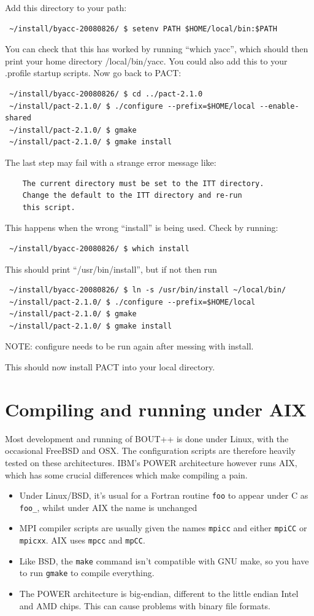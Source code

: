 \documentclass[12pt]{article}
\newcommand{\code}[1]{\texttt{#1}}
\begin{document}
Add this directory to your path:
\begin{verbatim}
 ~/install/byacc-20080826/ $ setenv PATH $HOME/local/bin:$PATH
\end{verbatim}
You can check that this has worked by running ``which yacc'', which should then print
your home directory /local/bin/yacc.
You could also add this to your .profile startup scripts. Now go back to PACT:
\begin{verbatim}
 ~/install/byacc-20080826/ $ cd ../pact-2.1.0
 ~/install/pact-2.1.0/ $ ./configure --prefix=$HOME/local --enable-shared
 ~/install/pact-2.1.0/ $ gmake
 ~/install/pact-2.1.0/ $ gmake install
\end{verbatim}

The last step may fail with a strange error message like:
\begin{verbatim}
    The current directory must be set to the ITT directory.
    Change the default to the ITT directory and re-run
    this script.
\end{verbatim}
This happens when the wrong ``install'' is being used. Check by running:
\begin{verbatim}
 ~/install/byacc-20080826/ $ which install
\end{verbatim}
This should print ``/usr/bin/install'', but if not then run
\begin{verbatim}
 ~/install/byacc-20080826/ $ ln -s /usr/bin/install ~/local/bin/
 ~/install/pact-2.1.0/ $ ./configure --prefix=$HOME/local
 ~/install/pact-2.1.0/ $ gmake
 ~/install/pact-2.1.0/ $ gmake install
\end{verbatim}
NOTE: configure needs to be run again after messing with install.

This should now install PACT into your local directory.

\section{Compiling and running under AIX}

Most development and running of BOUT++ is done under Linux, with the occasional FreeBSD and OSX.
The configuration scripts are therefore heavily tested on these architectures. IBM's POWER
architecture however runs AIX, which has some crucial differences which make compiling a pain.

\begin{itemize}
\item Under Linux/BSD, it's usual for a Fortran routine \code{foo} to appear
  under C as \code{foo\_}, whilst under AIX the name is unchanged
\item MPI compiler scripts are usually given the names \code{mpicc} and
  either \code{mpiCC} or \code{mpicxx}. AIX uses \code{mpcc} and \code{mpCC}.
\item Like BSD, the \code{make} command isn't compatible with GNU make,
  so you have to run \code{gmake} to compile everything.
\item The POWER architecture is big-endian, different to the little endian 
  Intel and AMD chips. This can cause problems with binary file formats.
\end{itemize}
\end{document}

